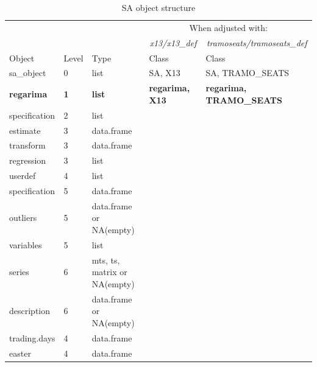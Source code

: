 \documentclass[article]{jss}
\begin{document}
\begingroup\fontsize{7}{9}\selectfont

\begin{longtable}{lllll}
\caption{\label{tab:unnamed-chunk-3}\label{tab:obj_tab}SA object structure}\\
\toprule
\multicolumn{1}{c}{ } & \multicolumn{1}{c}{ } & \multicolumn{1}{c}{ } & \multicolumn{2}{c}{When adjusted with:} \\
\cmidrule(l{3pt}r{3pt}){4-5}
\multicolumn{1}{c}{\em{ }} & \multicolumn{1}{c}{\em{ }} & \multicolumn{1}{c}{\em{ }} & \multicolumn{1}{c}{\em{x13/x13\_def}} & \multicolumn{1}{c}{\em{ tramoseats/tramoseats\_def}} \\
\cmidrule(l{3pt}r{3pt}){4-4} \cmidrule(l{3pt}r{3pt}){5-5}
Object & Level & Type & Class & Class\\
\midrule
sa\_object & 0 & list & SA, X13 & SA, TRAMO\_SEATS\\
\textbf{\hspace{1em}regarima} & \textbf{1} & \textbf{list} & \textbf{regarima, X13} & \textbf{regarima, TRAMO\_SEATS}\\
\hspace{2em}specification & 2 & list &  & \\
\hspace{3em}estimate & 3 & data.frame &  & \\
\hspace{3em}transform & 3 & data.frame &  & \\
\addlinespace
\hspace{3em}regression & 3 & list &  & \\
\hspace{4em}userdef & 4 & list &  & \\
\hspace{5em}specification & 5 & data.frame &  & \\
\hspace{5em}outliers & 5 & data.frame or NA(empty) &  & \\
\hspace{5em}variables & 5 & list &  & \\
\addlinespace
\hspace{6em}series & 6 & mts, ts, matrix or NA(empty) &  & \\
\hspace{6em}description & 6 & data.frame or NA(empty) &  & \\
\hspace{4em}trading.days & 4 & data.frame &  & \\
\hspace{4em}easter & 4 & data.frame &  & \\

\end{longtable}
\end{document}
